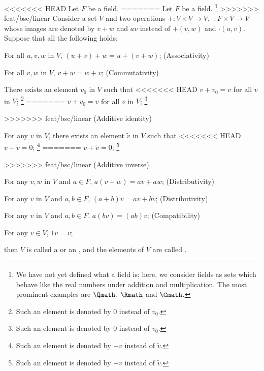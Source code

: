 \begin{definition}
    \label{def:vectorspace}
<<<<<<< HEAD
    Let \(F\) be a field.
=======
    Let \(F\) be a field.%
    \footnote{We have not yet defined what a field is;
    here, we consider fields as sets which behave like the real numbers
    under addition and multiplication.
    The most prominent examples are
    \(\Qmath\), \(\Rmath\) and \(\Cmath\).}
>>>>>>> feat/bsc/linear
    Consider a set \(V\) and two operations
    \(+:V\times V\to V\), \(\cdot:F\times V\to V\)
    whose images are denoted by \(v+w\) and \(av\)
    instead of \(+(v,w)\) and \(\cdot(a,v)\).
    Suppose that all the following holds:
    \begin{axioms}[Vsp]
        \item For all \(u,v,w\) in \(V\), \((u+v)+w=u+(v+w)\);
        \hfill\textsf{(Associativity)}

        \item For all \(v,w\) in \(V\), \(v+w=w+v\);
        \hfill\textsf{(Commutativity)}

        \item There exists an element \(v_0\) in \(V\) such that
<<<<<<< HEAD
        \(v+v_0=v\) for all \(v\) in \(V\);
        \footnote{
            Such an element is denoted by \(0\)
            instead of \(v_0\).}
=======
        \(v+v_0=v\) for all \(v\) in \(V\);%
        \footnote{
            Such an element is denoted by \(0\)
            instead of \(v_0\).}

>>>>>>> feat/bsc/linear
        \hfill\textsf{(Additive identity)}

        \item For any \(v\) in \(V\),
        there exists an element \(\tilde v\) in \(V\) such that
<<<<<<< HEAD
        \(v+\tilde v=0\);
        \footnote{
            Such an element is denoted by \(-v\)
            instead of \(\tilde v\).}
=======
        \(v+\tilde v=0\);%
        \footnote{
            Such an element is denoted by \(-v\)
            instead of \(\tilde v\).}

>>>>>>> feat/bsc/linear
        \hfill\textsf{(Additive inverse)}

        \item For any \(v,w\) in \(V\) and \(a\in F\),
        \(a(v+w)=av+aw\);
        \hfill\textsf{(Distributivity)}

        \item For any \(v\) in \(V\) and \(a,b\in F\),
        \((a+b)v=av+bv\);
        \hfill\textsf{(Distributivity)}

        \item For any \(v\) in \(V\) and \(a,b\in F\).
        \(a(bv)=(ab)v\);
        \hfill\textsf{(Compatibility)}

        \item For any \(v\in V\), \(1v=v\);
    \end{axioms}
    then \(V\) is called
    a 
    or an ,
    and the elements of \(V\) are called
    .
\end{definition}


